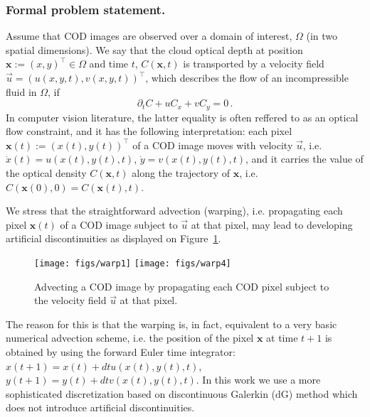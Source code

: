 \documentclass[onecolumn, 12pt, conference]{ieeeconf}
\renewcommand{\u}{\vec{u}}
\begin{document}
\subsubsection{Formal problem statement.}
\label{s:problem_statement}
Assume that COD images are observed over a domain of interest, $\Omega$ (in two spatial dimensions). We say that the cloud optical depth at position $\bm{x}:=(x,y)^\top\in\Omega$ and time $t$, $C(\bm{x},t)$ is transported by a velocity field $\u = (u(x,y,t),v(x,y,t))^\top$, which describes the flow of an incompressible fluid in $\Omega$, if
\begin{equation}\label{eq:state}
  \partial_t C + uC_x + vC_y=0\,.
\end{equation}
In computer vision literature, the latter equality is often reffered to as an optical flow constraint, and it has the following interpretation: each pixel $\bm{x}(t):=(x(t),y(t))^\top$ of a COD image moves with velocity $\u$, i.e. $\dot x(t) = u(x(t),y(t),t)$, $\dot y = v(x(t),y(t),t)$, and it carries the value of the optical density $C(\bm{x},t)$ along the trajectory of $\bm{x}$, i.e. $C(\bm{x}(0),0)=C(\bm{x}(t),t)$.

We stress that the straightforward advection (warping), i.e. propagating each pixel $\bm{x}(t)$ of a COD image subject to $\u$ at that pixel, may lead to developing artificial discontinuities as displayed on Figure~\ref{fig:groundtruth}.
\begin{figure}[h]
  \centering
  \texttt{[image: figs/warp1]}
  \texttt{[image: figs/warp4]}
  \caption{Advecting a COD image by propagating each COD pixel subject to the velocity field $\u$ at that pixel.\label{fig:groundtruth}}
\end{figure}
The reason for this is that the warping is, in fact, equivalent to a very basic  numerical advection scheme, i.e. the position of the pixel $\bm{x}$ at time $t+1$ is obtained by using the forward Euler time integrator: $x(t+1) = x(t) + dt u(x(t),y(t),t)$, $y(t+1) = y(t) + dt v(x(t),y(t),t)$. In this work we use a more sophisticated discretization based on discontinuous Galerkin (dG) method which does not introduce artificial discontinuities.
\end{document}
